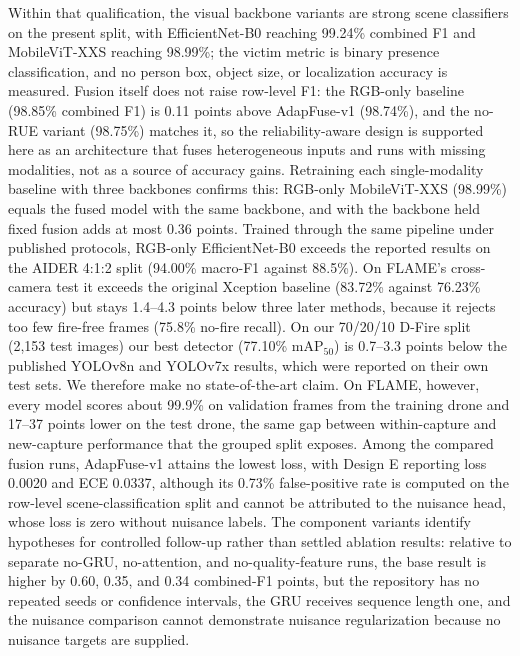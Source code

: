 \documentclass[journal]{IEEEtran}
\begin{document}
Within that qualification, the visual backbone variants are strong scene classifiers on the present split, with EfficientNet-B0 reaching 99.24\% combined F1 and MobileViT-XXS reaching 98.99\%; the victim metric is binary presence classification, and no person box, object size, or localization accuracy is measured. Fusion itself does not raise row-level F1: the RGB-only baseline (98.85\% combined F1) is 0.11 points above AdapFuse-v1 (98.74\%), and the no-RUE variant (98.75\%) matches it, so the reliability-aware design is supported here as an architecture that fuses heterogeneous inputs and runs with missing modalities, not as a source of accuracy gains. Retraining each single-modality baseline with three backbones confirms this: RGB-only MobileViT-XXS (98.99\%) equals the fused model with the same backbone, and with the backbone held fixed fusion adds at most 0.36 points. Trained through the same pipeline under published protocols, RGB-only EfficientNet-B0 exceeds the reported results on the AIDER 4:1:2 split (94.00\% macro-F1 against 88.5\%). On FLAME's cross-camera test it exceeds the original Xception baseline (83.72\% against 76.23\% accuracy) but stays 1.4--4.3 points below three later methods, because it rejects too few fire-free frames (75.8\% no-fire recall). On our 70/20/10 D-Fire split (2{,}153 test images) our best detector (77.10\% mAP$_{50}$) is 0.7--3.3 points below the published YOLOv8n and YOLOv7x results, which were reported on their own test sets. We therefore make no state-of-the-art claim. On FLAME, however, every model scores about 99.9\% on validation frames from the training drone and 17--37 points lower on the test drone, the same gap between within-capture and new-capture performance that the grouped split exposes. Among the compared fusion runs, AdapFuse-v1 attains the lowest loss, with Design E reporting loss 0.0020 and ECE 0.0337, although its 0.73\% false-positive rate is computed on the row-level scene-classification split and cannot be attributed to the nuisance head, whose loss is zero without nuisance labels. The component variants identify hypotheses for controlled follow-up rather than settled ablation results: relative to separate no-GRU, no-attention, and no-quality-feature runs, the base result is higher by 0.60, 0.35, and 0.34 combined-F1 points, but the repository has no repeated seeds or confidence intervals, the GRU receives sequence length one, and the nuisance comparison cannot demonstrate nuisance regularization because no nuisance targets are supplied.
\end{document}
